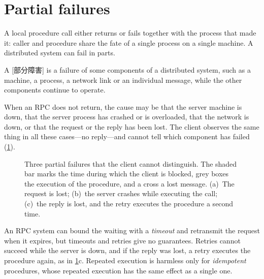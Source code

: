 \documentclass[../main.tex]{subfiles}
\begin{document}
\section{Partial failures}
\label{sec:l13-failures}

A local procedure call either returns or fails together with the process
that made it: caller and procedure share the fate of a single
process on a single machine.  A distributed system can fail in parts.

\begin{definition}
  A [部分障害] is a failure of some components of a
  distributed system, such as a machine, a process, a network link or an
  individual message, while the other components continue to operate.
\end{definition}

When an RPC does not return, the cause may be that the server machine is
down, that the server process has crashed or is overloaded, that the network
is down, or that the request or the reply has been lost.  The client
observes the same thing in all these cases---no reply---and cannot tell
which component has failed (\cref{fig:l13-failures}).

\begin{figure}[htbp]
  \centering
  
  \caption{Three partial failures that the client cannot distinguish.  The
    shaded bar marks the time during which the client is blocked, grey
    boxes the execution of the procedure, and a cross a lost message.
    (a)~The request is lost; (b)~the
    server crashes while executing the call; (c)~the reply is lost, and the
    retry executes the procedure a second time.}
  \label{fig:l13-failures}
\end{figure}

An RPC system can bound the waiting with a \emph{timeout} and retransmit
the request when it expires, but timeouts and retries give no
guarantees.
Retries cannot succeed while the server is down, and if the reply was lost,
a retry executes the procedure again, as in \cref{fig:l13-failures}c.
Repeated execution is harmless only for \emph{idempotent} procedures,
whose repeated execution has the same effect as a single one.
\end{document}
